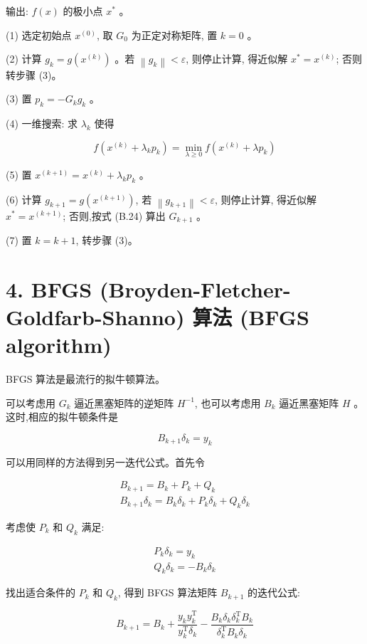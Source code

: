 \documentclass[10pt]{article}
\begin{document}
输出: $f(x)$ 的极小点 $x^{*}$ 。

(1) 选定初始点 $x^{(0)}$, 取 $G_{0}$ 为正定对称矩阵, 置 $k=0$ 。

(2) 计算 $g_{k}=g\left(x^{(k)}\right)$ 。若 $\left\|g_{k}\right\|<\varepsilon$, 则停止计算, 得近似解 $x^{*}=x^{(k)}$; 否则转步骤 (3)。

(3) 置 $p_{k}=-G_{k} g_{k}$ 。

(4) 一维搜索: 求 $\lambda_{k}$ 使得

$$
f\left(x^{(k)}+\lambda_{k} p_{k}\right)=\min _{\lambda \geqslant 0} f\left(x^{(k)}+\lambda p_{k}\right)
$$

(5) 置 $x^{(k+1)}=x^{(k)}+\lambda_{k} p_{k}$ 。

(6) 计算 $g_{k+1}=g\left(x^{(k+1)}\right)$, 若 $\left\|g_{k+1}\right\|<\varepsilon$, 则停止计算, 得近似解 $x^{*}=x^{(k+1)}$; 否则,按式 (B.24) 算出 $G_{k+1}$ 。

(7) 置 $k=k+1$, 转步骤 (3)。

\section*{4. BFGS (Broyden-Fletcher-Goldfarb-Shanno) 算法 (BFGS algorithm)}
BFGS 算法是最流行的拟牛顿算法。

可以考虑用 $G_{k}$ 逼近黑塞矩阵的逆矩阵 $H^{-1}$, 也可以考虑用 $B_{k}$ 逼近黑塞矩阵 $H$ 。这时,相应的拟牛顿条件是


\begin{equation*}
B_{k+1} \delta_{k}=y_{k} \tag{B.25}
\end{equation*}


可以用同样的方法得到另一迭代公式。首先令


\begin{gather*}
B_{k+1}=B_{k}+P_{k}+Q_{k}  \tag{B.26}\\
B_{k+1} \delta_{k}=B_{k} \delta_{k}+P_{k} \delta_{k}+Q_{k} \delta_{k} \tag{B.27}
\end{gather*}


考虑使 $P_{k}$ 和 $Q_{k}$ 满足:


\begin{gather*}
P_{k} \delta_{k}=y_{k}  \tag{B.28}\\
Q_{k} \delta_{k}=-B_{k} \delta_{k} \tag{B.29}
\end{gather*}


找出适合条件的 $P_{k}$ 和 $Q_{k}$, 得到 BFGS 算法矩阵 $B_{k+1}$ 的迭代公式:


\begin{equation*}
B_{k+1}=B_{k}+\frac{y_{k} y_{k}^{\mathrm{T}}}{y_{k}^{\mathrm{T}} \delta_{k}}-\frac{B_{k} \delta_{k} \delta_{k}^{\mathrm{T}} B_{k}}{\delta_{k}^{\mathrm{T}} B_{k} \delta_{k}} \tag{B.30}
\end{equation*}
\end{document}
